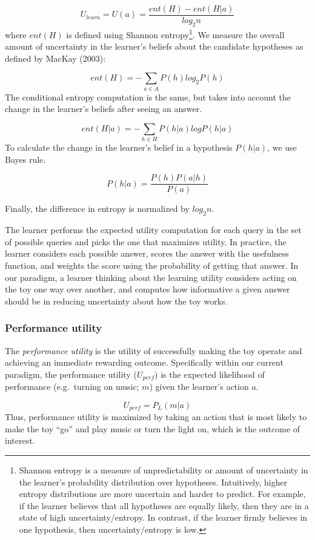 \documentclass[10pt, letterpaper]{article}
\begin{document}
\[ U_{learn} = U(a) = \frac{ent(H) - ent(H|a)}{log_2n}\] \noindent
where \(ent(H)\) is defined using Shannon
entropy\footnote{Shannon entropy is a measure of unpredictability or amount of uncertainty in the learner's probability distribution over hypotheses. Intuitively, higher entropy distributions are more uncertain and harder to predict. For example, if the learner believes that all hypotheses are equally likely, then they are in a state of high uncertainty/entropy. In contrast, if the learner firmly believes in one hypothesis, then uncertainty/entropy is low.}.
We measure the overall amount of uncertainty in the learner's beliefs
about the candidate hypotheses as defined by MacKay (2003):

\[ent(H) = -\sum_{a\in A}{P(h)log_2P(h)}\] \noindent
The conditional entropy computation is the same, but takes into account
the change in the learner's beliefs after seeing an answer.

\[ ent(H|a) = -\sum_{h\in H}{P(h|a)logP(h|a)} \] \noindent
To calculate the change in the learner's belief in a hypothesis
\(P(h|a)\), we use Bayes rule.

\[ P(h|a) = \frac{P(h)P(a|h)}{P(a)} \]

\noindent
Finally, the difference in entropy is normalized by \(log_2 n\).

The learner performs the expected utility computation for each query in
the set of possible queries and picks the one that maximizes utility. In
practice, the learner considers each possible answer, scores the answer
with the usefulness function, and weights the score using the
probability of getting that answer. In our paradigm, a learner thinking
about the learning utility considers acting on the toy one way over
another, and computes how informative a given answer should be in
reducing uncertainty about how the toy works.

\subsubsection{Performance utility}\label{performance-utility}

The \emph{performance utility} is the utility of successfully making the
toy operate and achieving an immediate rewarding outcome. Specifically
within our current paradigm, the performance utility (\(U_{perf}\)) is
the expected likelihood of performance (e.g.~turning on music; \(m\))
given the learner's action \(a\).

\[ U_{perf} = P_L(m | a) \] \noindent
Thus, performance utility is maximized by taking an action that is most
likely to make the toy ``go'' and play music or turn the light on, which
is the outcome of interest.
\end{document}
